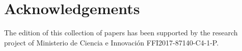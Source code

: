 \documentclass[output=paper,modfonts,nonflat,colorlinks,citecolor=brown]{langsci/langscibook}
\begin{document}
\section*{Acknowledgements}
The edition of this collection of papers has been supported by the research project of Ministerio de Ciencia e Innovación FFI2017-87140-C4-1-P.

\sloppy\printbibliography[heading=subbibliography,notkeyword=this]
\end{document}
